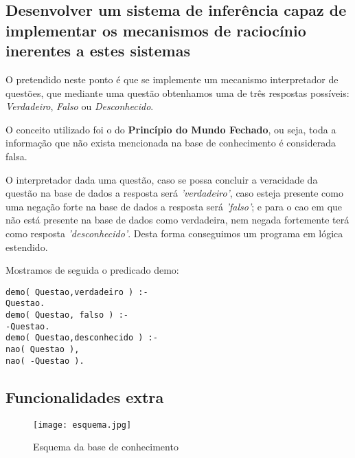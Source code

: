 \subsection{Desenvolver um sistema de inferência capaz de implementar os mecanismos de raciocínio inerentes a estes sistemas}

O pretendido neste ponto é que se implemente um mecanismo interpretador de questões, que mediante uma questão obtenhamos uma de três respostas possíveis: \textit{Verdadeiro}, \textit{Falso} ou \textit{Desconhecido}. 

O conceito utilizado foi o do \textbf{Princípio do Mundo Fechado}, ou seja, toda a informação que não exista mencionada na base de conhecimento é considerada falsa. 

O interpretador dada uma questão, caso se possa concluir a veracidade da questão na base de dados a resposta será \textit{'verdadeiro'}, caso esteja presente como uma negação forte na base de dados a resposta será \textit{'falso'}; e para o cao em que não está presente na base de dados como verdadeira, nem negada fortemente terá como resposta \textit{'desconhecido'}. Desta forma conseguimos um programa em lógica estendido. 

Mostramos de seguida o predicado demo: 
\begin{verbatim}
demo( Questao,verdadeiro ) :-
Questao.
demo( Questao, falso ) :-
-Questao.
demo( Questao,desconhecido ) :-
nao( Questao ),
nao( -Questao ).
\end{verbatim}

\subsection{Funcionalidades extra}

\begin{figure}[<+htpb+>]
	\centering
	\texttt{[image: esquema.jpg]}
	\caption{Esquema da base de conhecimento }
	\label{p3:fig:esquema1}
\end{figure}



